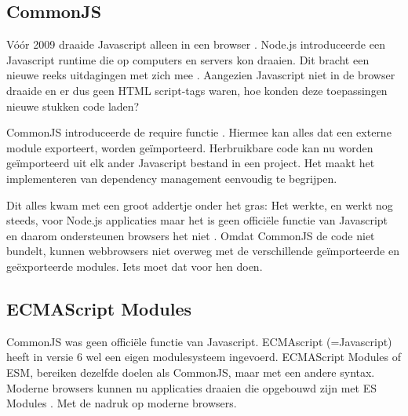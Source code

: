 

\subsection{CommonJS}

Vóór 2009 draaide \gls{Javascript} alleen in een browser \autocite{wikipedia-no-date}. Node.js introduceerde een \gls{Javascript} runtime die op computers en servers kon draaien. Dit bracht een nieuwe reeks uitdagingen met zich mee \autocite{crutchfield-2018}. Aangezien \gls{Javascript} niet in de browser draaide en er dus geen \gls{HTML} script-tags waren, hoe konden deze toepassingen nieuwe stukken code laden? 

CommonJS introduceerde de require functie \autocite{nodejs-2021}. Hiermee kan alles dat een externe module exporteert, worden geïmporteerd. Herbruikbare code kan nu worden geïmporteerd uit elk ander \gls{Javascript} bestand in een project. Het maakt het implementeren van dependency management eenvoudig te begrijpen.

Dit alles kwam met een groot addertje onder het gras: Het werkte, en werkt nog steeds, voor Node.js applicaties maar het is geen officiële functie van \gls{Javascript} en daarom ondersteunen browsers het niet \autocite{crutchfield-2018}. Omdat CommonJS de code niet bundelt, kunnen webbrowsers niet overweg met de verschillende geïmporteerde en geëxporteerde modules. Iets moet dat voor hen doen. 





\subsection{ECMAScript Modules}

CommonJS was geen officiële functie van Javascript. ECMAscript (=Javascript) heeft in versie 6 wel een eigen modulesysteem ingevoerd. ECMAScript Modules of ESM, bereiken dezelfde doelen als CommonJS, maar met een andere syntax. Moderne browsers kunnen nu applicaties draaien die opgebouwd zijn met ES Modules \autocite{mozilla-2021}. Met de nadruk op moderne browsers. 





